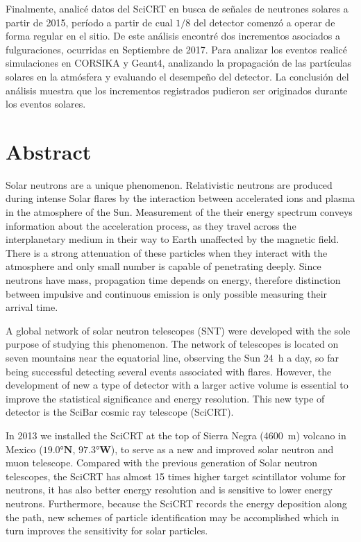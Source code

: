 Finalmente, analicé datos del SciCRT en busca de señales de neutrones solares a partir de \num{2015}, período a partir de cual $1/8$ del detector comenzó a operar de forma regular en el sitio. De este análisis encontré dos incrementos asociados a fulguraciones, ocurridas en Septiembre de \num{2017}. Para analizar los eventos realicé simulaciones en CORSIKA y Geant4, analizando la propagación de las partículas solares en la atmósfera y evaluando el desempeño del detector. La conclusión del análisis muestra que los incrementos registrados pudieron ser originados durante los eventos solares.

\chapter{Abstract}

Solar neutrons are a unique phenomenon. Relativistic neutrons are produced during intense Solar flares by the interaction between accelerated ions and plasma in the atmosphere of the Sun. Measurement of the their energy spectrum conveys information about the acceleration process, as they travel across the interplanetary medium in their way to Earth unaffected by the magnetic field. There is a strong attenuation of these particles when they interact with the atmosphere and only small number is capable of penetrating deeply. Since neutrons have mass, propagation time depends on energy, therefore distinction between impulsive and continuous emission is only possible measuring their arrival time.

A global network of solar neutron telescopes (SNT) were developed with the sole purpose of studying this phenomenon. The network of telescopes is located on seven mountains near the equatorial line, observing the Sun \SI{24}{\hour} a day, so far being successful detecting several events associated with flares. However, the development of new a type of detector with a larger active volume is essential to improve the statistical significance and energy resolution. This new type of detector is the SciBar cosmic ray telescope  (SciCRT).

In \num{2013} we installed the SciCRT at the top of Sierra Negra (\SI{4600}{\metre}) volcano in Mexico ($\ang{19.0}\mathbf{N}$, $\ang{97.3}\mathbf{W}$), to serve as a new and improved solar neutron and muon telescope. Compared with the previous generation of Solar neutron telescopes, the SciCRT has almost \num{15} times higher target scintillator volume for neutrons, it has also better energy resolution and is sensitive to lower energy neutrons. Furthermore, because the SciCRT records the energy deposition along the path, new schemes of particle identification may be accomplished which in turn improves the sensitivity for solar particles.

